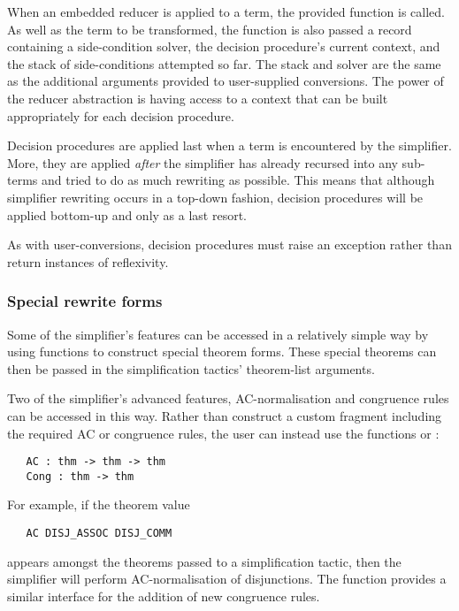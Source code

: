 When an embedded reducer is applied to a term, the provided 
function is called.  As well as the term to be transformed, the
 function is also passed a record containing a
side-condition solver, the decision procedure's current context, and
the stack of side-conditions attempted so far.  The stack and solver
are the same as the additional arguments provided to user-supplied
conversions.  The power of the reducer abstraction is having access to
a context that can be built appropriately for each decision procedure.

Decision procedures are applied last when a term is encountered by the
simplifier.  More, they are applied \emph{after} the simplifier has
already recursed into any sub-terms and tried to do as much rewriting
as possible.  This means that although simplifier rewriting occurs in
a top-down fashion, decision procedures will be applied bottom-up and
only as a last resort.

As with user-conversions, decision procedures must raise an exception
rather than return instances of reflexivity.

\subsubsection{Special rewrite forms}
\label{sec:simp-special-rewrite-forms}

Some of the simplifier's features can be accessed in a relatively
simple way by using \ML{} functions to construct special theorem
forms.  These special theorems can then be passed in the
simplification tactics' theorem-list arguments.

Two of the simplifier's advanced features, AC-normalisation and
congruence rules can be accessed in this way.  Rather than construct a
custom \simpset{} fragment including the required AC or congruence
rules, the user can instead use the functions  or :
\begin{hol}
\begin{verbatim}
   AC : thm -> thm -> thm
   Cong : thm -> thm
\end{verbatim}
\end{hol}
For example, if the theorem value
\begin{hol}
\begin{verbatim}
   AC DISJ_ASSOC DISJ_COMM
\end{verbatim}
\end{hol}
appears amongst the theorems passed to a simplification tactic, then
the simplifier will perform AC-normalisation of disjunctions.  The
 function provides a similar interface for the addition of
new congruence rules.

